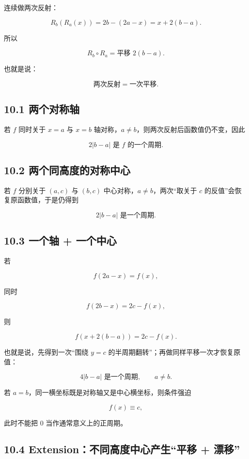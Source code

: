 \documentclass[11pt,a4paper]{ctexart}
\begin{document}
连续做两次反射：

\[
R_b(R_a(x))
=2b-(2a-x)
=x+2(b-a).
\]

所以

\[
\boxed{R_b\circ R_a=\text{平移 }2(b-a)}.
\]

也就是说：

\[
\boxed{\text{两次反射}=\text{一次平移}.}
\]

\subsection{10.1 两个对称轴}\label{ux4e24ux4e2aux5bf9ux79f0ux8f74}

若 \(f\) 同时关于 \(x=a\) 与 \(x=b\)
轴对称，\(a\ne b\)，则两次反射后函数值仍不变，因此

\[
\boxed{2|b-a|\text{ 是 }f\text{ 的一个周期}.}
\]

\subsection{10.2
两个同高度的对称中心}\label{ux4e24ux4e2aux540cux9ad8ux5ea6ux7684ux5bf9ux79f0ux4e2dux5fc3}

若 \(f\) 分别关于 \((a,c)\) 与 \((b,c)\)
中心对称，\(a\ne b\)，两次``取关于 \(c\)
的反值''会恢复原函数值，于是仍得到

\[
\boxed{2|b-a|\text{ 是一个周期}.}
\]

\subsection{10.3 一个轴 +
一个中心}\label{ux4e00ux4e2aux8f74-ux4e00ux4e2aux4e2dux5fc3}

若

\[
f(2a-x)=f(x),
\]

同时

\[
f(2b-x)=2c-f(x),
\]

则

\[
\boxed{f(x+2(b-a))=2c-f(x)}.
\]

也就是说，先得到一次``围绕 \(y=c\)
的半周期翻转''；再做同样平移一次才恢复原值：

\[
\boxed{4|b-a|\text{ 是一个周期}},\qquad a\ne b.
\]

若 \(a=b\)，同一横坐标既是对称轴又是中心横坐标，则条件强迫

\[
f(x)\equiv c,
\]

此时不能把 \(0\) 当作通常意义上的正周期。

\subsection{10.4 Extension：不同高度中心产生``平移 +
漂移''}\label{extensionux4e0dux540cux9ad8ux5ea6ux4e2dux5fc3ux4ea7ux751fux5e73ux79fb-ux6f02ux79fb}
\end{document}
